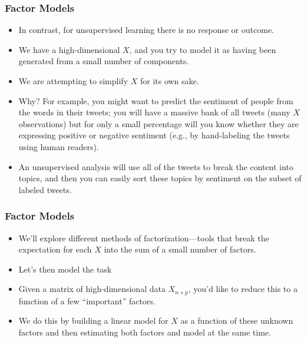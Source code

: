 \documentclass[
  shownotes,
  xcolor={svgnames},
  hyperref={colorlinks,citecolor=DarkBlue,linkcolor=DarkRed,urlcolor=DarkBlue}
  , aspectratio=169]{beamer}
\begin{document}
\begin{frame}
\frametitle{Factor Models}

\begin{itemize}

 \item In contrast, for unsupervised learning there is no response or outcome. 
 \medskip
 \item We have a high-dimensional $X$, and you try to model it as having been generated from a small number of components. 
 \medskip
 \item We are attempting to simplify $X$ for its own sake. 
 \medskip
 \item Why? For example, you might want to predict the sentiment of people from the words in their tweets; you will have a massive bank of all tweets (many $X$ observations) but for only a small percentage will you know whether they are expressing positive or negative sentiment (e.g., by hand-labeling the tweets using human readers). 
 \medskip
 \item An unsupervised analysis will use all of the tweets to break the content into topics, and then you can easily sort these topics by sentiment on the subset of labeled tweets. 

\end{itemize}
\end{frame}
\begin{frame}
\frametitle{Factor Models}

\begin{itemize}

 \item We’ll explore different methods of factorization—tools that break the expectation for each $X$ into the sum of a small number of factors.
\medskip
\item Let's then model the task
\medskip
\pause
\item Given a matrix of high-dimensional data $X_{n\times p}$, you’d like to reduce this to a function of a few “important” factors. 
\medskip
\item We do this by building a linear model for $X$ as a function of these unknown factors and then estimating both factors and model at the same time.


\end{itemize}
\end{frame}
\end{document}
